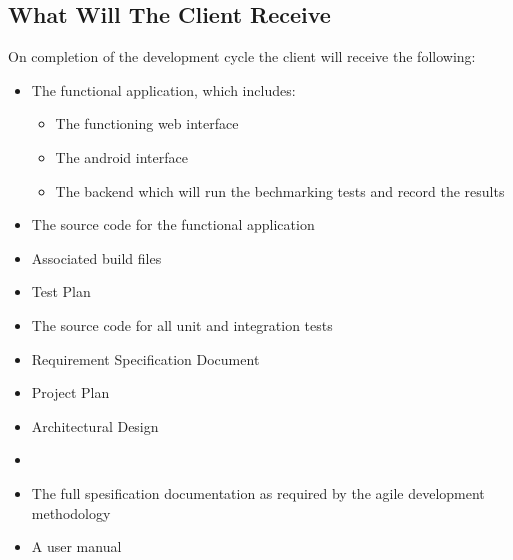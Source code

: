 \subsection{What Will The Client Receive}
On completion of the development cycle the client will receive the following:
\begin{itemize}
	\item The functional application, which includes:
	\begin{itemize}
		\item The functioning web interface
		\item The android interface
		\item The backend which will run the bechmarking tests and record the results
	\end{itemize}
	\item The source code for the functional application
	\item Associated build files
	\item Test Plan
	\item The source code for all unit and integration tests
	\item Requirement Specification Document
	\item Project Plan
	\item Architectural Design
	\item
	\item The full spesification documentation as required by the agile development methodology
	\item A user manual
\end{itemize}
